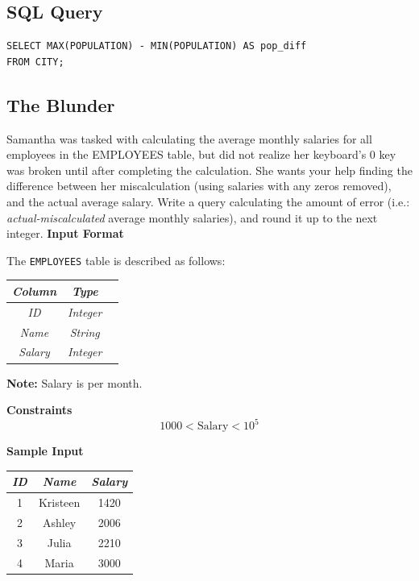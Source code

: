 \documentclass[12pt,a4paper]{article}
\renewcommand{\arraystretch}{1.5} %
\begin{document}
\subsection*{SQL Query}
\begin{lstlisting}[style=sqlstyle]
SELECT MAX(POPULATION) - MIN(POPULATION) AS pop_diff
FROM CITY;
\end{lstlisting}
\subsection{The Blunder}
Samantha was tasked with calculating the average monthly salaries for all employees in the EMPLOYEES table, but did not realize her keyboard's 0 key was broken until after completing the calculation. She wants your help finding the difference between her miscalculation (using salaries with any zeros removed), and the actual average salary.
Write a query calculating the amount of error (i.e.: \textit{actual-miscalculated} average monthly salaries), and round it up to the next integer.
\textbf{Input Format}

The \texttt{EMPLOYEES} table is described as follows:

\begin{table}[H]
\centering
\renewcommand{\arraystretch}{1.3}
\begin{tabular}{|c|c|c|}
\hline
\textit{Column} & \textit{Type} \\ \hline
\textit{ID} & \textit{Integer} \\ \hline
\textit{Name} & \textit{String} \\ \hline
\textit{Salary} & \textit{Integer} \\ \hline
\end{tabular}
\end{table}

\textbf{Note:} Salary is per month.

\textbf{Constraints}
\[
1000 < \text{Salary} < 10^5
\]

\textbf{Sample Input}

\begin{table}[H]
\centering
\renewcommand{\arraystretch}{1.3}
\begin{tabular}{|c|c|c|}
\hline
\textit{ID} & \textit{Name} & \textit{Salary} \\ \hline
1 & Kristeen & 1420 \\ \hline
2 & Ashley   & 2006 \\ \hline
3 & Julia    & 2210 \\ \hline
4 & Maria    & 3000 \\ \hline
\end{tabular}
\end{table}
\end{document}
